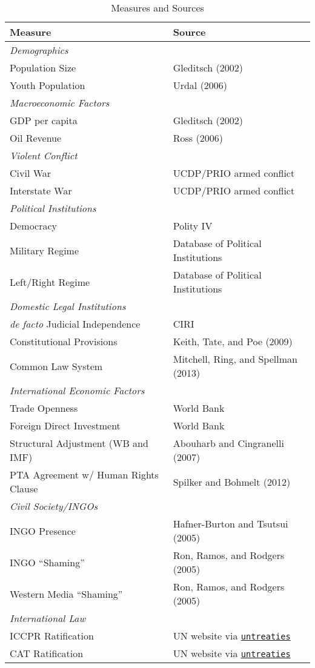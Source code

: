 \documentclass[12pt]{article}
\begin{document}
\begin{table}[htbp!] 
\caption{Measures and Sources} 
\label{tab:vars}
\centering
\begin{tabular}{ll}
Measure & Source \\
\toprule
{\em Demographics} & \\
Population Size & Gleditsch (2002) \\
Youth Population & Urdal (2006) \\ 
\midrule
{\em Macroeconomic Factors} & \\
GDP per capita & Gleditsch (2002) \\
Oil Revenue & Ross (2006) \\ 
\midrule
{\em Violent Conflict} & \\
Civil War & UCDP/PRIO armed conflict \\
Interstate War & UCDP/PRIO armed conflict \\
\midrule
{\em Political Institutions} & \\
Democracy & Polity IV\\
Military Regime & Database of Political Institutions \\
Left/Right Regime & Database of Political Institutions  \\
\midrule
{\em Domestic Legal Institutions} & \\
{\em de facto} Judicial Independence & CIRI \\
Constitutional Provisions & Keith, Tate, and Poe (2009) \\
Common Law System & Mitchell, Ring, and Spellman (2013) \\
\midrule
{\em International Economic Factors} & \\
Trade Openness & World Bank \\
Foreign Direct Investment & World Bank \\
Structural Adjustment (WB and IMF) & Abouharb and Cingranelli (2007) \\
PTA Agreement w/ Human Rights Clause & Spilker and Bohmelt (2012) \\
\midrule
{\em Civil Society/INGOs} & \\
INGO Presence & Hafner-Burton and Tsutsui (2005) \\
INGO ``Shaming'' & Ron, Ramos, and Rodgers (2005)  \\
Western Media ``Shaming'' & Ron, Ramos, and Rodgers (2005) \\
\midrule
{\em International Law} & \\
ICCPR Ratification & UN website via {\tt \href{http://github.com/zmjones/untreaties}{untreaties}} \\
CAT Ratification & UN website via {\tt \href{http://github.com/zmjones/untreaties}{untreaties}} \\
\bottomrule
\end{tabular}
\end{table}
\end{document}
